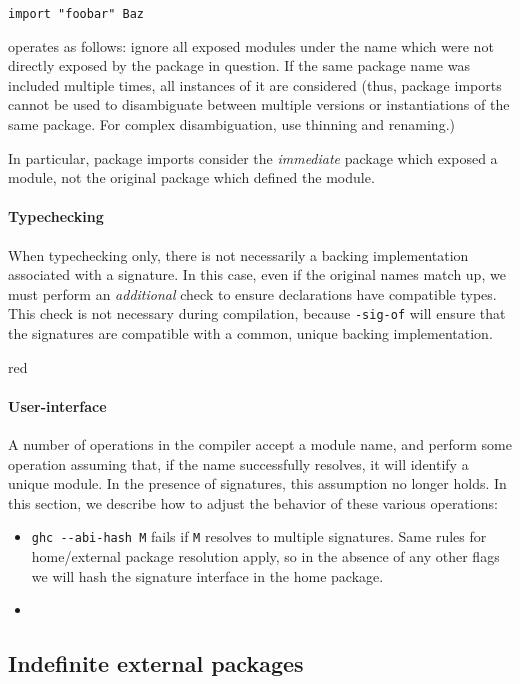 \documentclass{article}
\newcommand{\Red}[1]{{\color{red} #1}}
\begin{document}
\begin{verbatim}
import "foobar" Baz
\end{verbatim}

operates as follows: ignore all exposed modules under the name which
were not directly exposed by the package in question.  If the same
package name was included multiple times, all instances of it are
considered (thus, package imports cannot be used to disambiguate
between multiple versions or instantiations of the same package.
For complex disambiguation, use thinning and renaming.)

In particular, package imports consider the \emph{immediate} package
which exposed a module, not the original package which defined the
module.

\paragraph{Typechecking}  \Red{When typechecking only, there is not
necessarily a backing implementation associated with a signature.  In
this case, even if the original names match up, we must perform an
\emph{additional} check to ensure declarations have compatible types.}
This check is not necessary during compilation, because \texttt{-sig-of}
will ensure that the signatures are compatible with a common, unique
backing implementation.

\begin{color}{red}
\paragraph{User-interface}  A number of operations in the compiler
accept a module name, and perform some operation assuming that, if
the name successfully resolves, it will identify a unique module.  In
the presence of signatures, this assumption no longer holds.   In this
section, we describe how to adjust the behavior of these various
operations:

\begin{itemize}
    \item \verb|ghc --abi-hash M| fails if \texttt{M} resolves to multiple
        signatures.  Same rules for home/external package resolution apply,
        so in the absence of any other flags we will hash the signature
        interface in the home package.
    \item
\end{itemize}
\end{color}

\subsection{Indefinite external packages}
\end{document}
